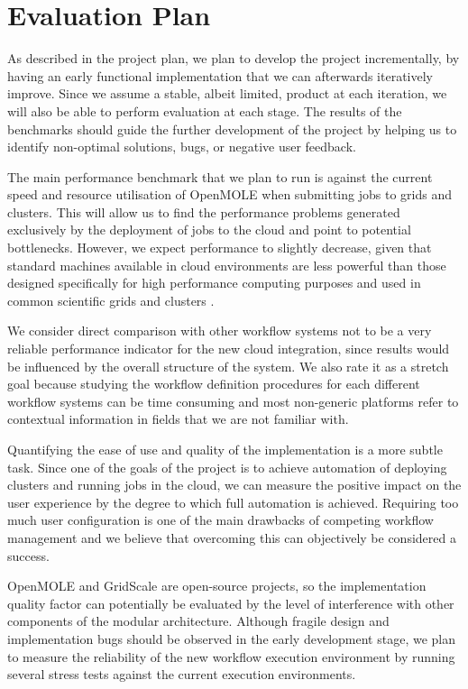 \chapter{Evaluation Plan}

As described in the project plan, we plan to develop the project incrementally, by having an early functional implementation that we can afterwards iteratively improve. Since we assume a stable, albeit limited, product at each iteration, we will also be able to perform evaluation at each stage. The results of the benchmarks should guide the further development of the project by helping us to identify non-optimal solutions, bugs, or negative user feedback.

The main performance benchmark that we plan to run is against the current speed and resource utilisation of OpenMOLE when submitting jobs to grids and clusters. This will allow us to find the performance problems generated exclusively by the deployment of jobs to the cloud and point to potential bottlenecks. However, we expect performance to slightly decrease, given that standard machines available in cloud environments are less powerful than those designed specifically for high performance computing purposes and used in common scientific grids and clusters \cite{Juve2009}.

We consider direct comparison with other workflow systems not to be a very reliable performance indicator for the new cloud integration, since results would be influenced by the overall structure of the system. We also rate it as a stretch goal because studying the workflow definition procedures for each different workflow systems can be time consuming and most non-generic platforms refer to contextual information in fields that we are not familiar with.

Quantifying the ease of use and quality of the implementation is a more subtle task. Since one of the goals of the project is to achieve automation of deploying clusters and running jobs in the cloud, we can measure the positive impact on the user experience by the degree to which full automation is achieved. Requiring too much user configuration is one of the main drawbacks of competing workflow management and we believe that overcoming this can objectively be considered a success.

OpenMOLE and GridScale are open-source projects, so the implementation quality factor can potentially be evaluated by the level of interference with other components of the modular architecture. Although fragile design and implementation bugs should be observed in the early development stage, we plan to measure the reliability of the new workflow execution environment by running several stress tests against the current execution environments.